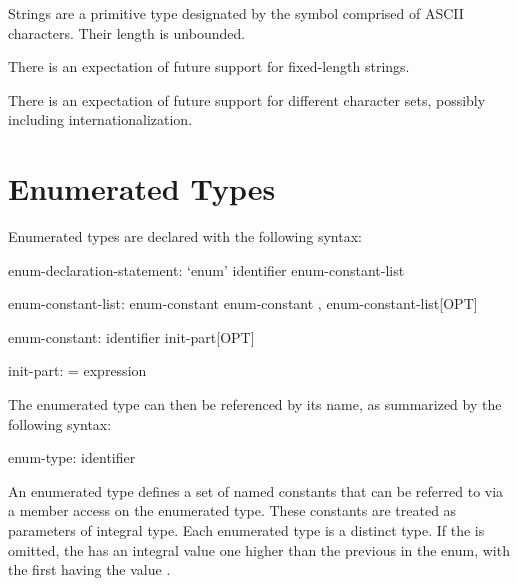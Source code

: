 Strings are a primitive type designated by the symbol 
comprised of ASCII characters.  Their length is unbounded.


\begin{openissue}
There is an expectation of future support for fixed-length strings.
\end{openissue}

\begin{openissue}
There is an expectation of future support for different character
sets, possibly including internationalization.
\end{openissue}


\section{Enumerated Types}
\label{Enumerated_Types}

Enumerated types are declared with the following syntax:

\begin{syntax}
enum-declaration-statement:
  `enum' identifier { enum-constant-list }

enum-constant-list:
  enum-constant
  enum-constant , enum-constant-list[OPT]

enum-constant:
  identifier init-part[OPT]

init-part:
  = expression
\end{syntax}

The enumerated type can then be referenced by its name, as summarized
by the following syntax:

\begin{syntax}
enum-type:
  identifier
\end{syntax}

An enumerated type defines a set of named constants that can be
referred to via a member access on the enumerated type.
These constants are treated as parameters of integral type.  Each
enumerated type is a distinct type. If the  is
omitted, the  has an integral value one higher
than the previous  in the enum, with the first
having the value .

